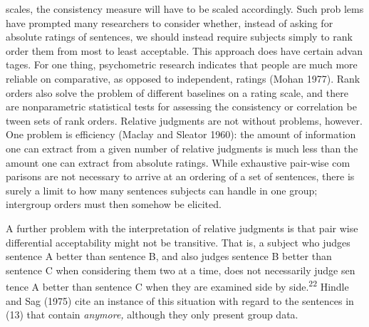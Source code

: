 \begin{styleTextbody}
scales, the consistency measure will have to be scaled accordingly. Such prob\- lems have prompted many researchers to consider whether, instead of asking for absolute ratings of sentences, we should instead require subjects simply to rank order them from most to least acceptable. This approach does have certain advan\- tages. For one thing, psychometric research indicates that people are much more reliable on comparative, as opposed to independent, ratings (Mohan 1977). Rank orders also solve the problem of different baselines on a rating scale, and there are nonparametric statistical tests for assessing the consistency or correlation be\- tween sets of rank orders. Relative judgments are not without problems, however. One problem is efficiency (Maclay and Sleator 1960): the amount of information one can extract from a given number of relative judgments is much less than the amount one can extract from absolute ratings. While exhaustive pair-wise com\- parisons are not necessary to arrive at an ordering of a set of sentences, there is surely a limit to how many sentences subjects can handle in one group; intergroup orders must then somehow be elicited.
\end{styleTextbody}


\begin{styleTextbody}
A further problem with the interpretation of relative judgments is that pair\- wise differential acceptability might not be transitive. That is, a subject who judges sentence A better than sentence B, and also judges sentence B better than sentence C when considering them two at a time, does not necessarily judge sen\- tence A better than sentence C when they are examined side by side.\textsuperscript{22}\textsuperscript{ }Hindle and Sag (1975) cite an instance of this situation with regard to the sentences in (13) that contain \textit{anymore,}\textit{ }although they only present group data.
\end{styleTextbody}


